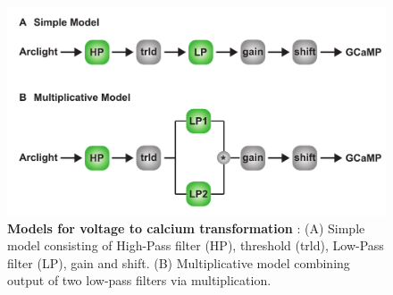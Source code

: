 \documentclass[9pt,lineno]{elife}
\begin{document}
\begin{figure}
\begin{fullwidth}
\includegraphics[width=0.84\linewidth]{figure4}
\caption{\textbf{Models for voltage to calcium transformation} : (A) Simple model consisting of High-Pass filter (HP), threshold (trld), Low-Pass filter (LP), gain and shift. (B) Multiplicative model combining output of two low-pass filters via multiplication. }

\label{Modelillustration}
	
\end{fullwidth}
\end{figure} 
\end{document}
